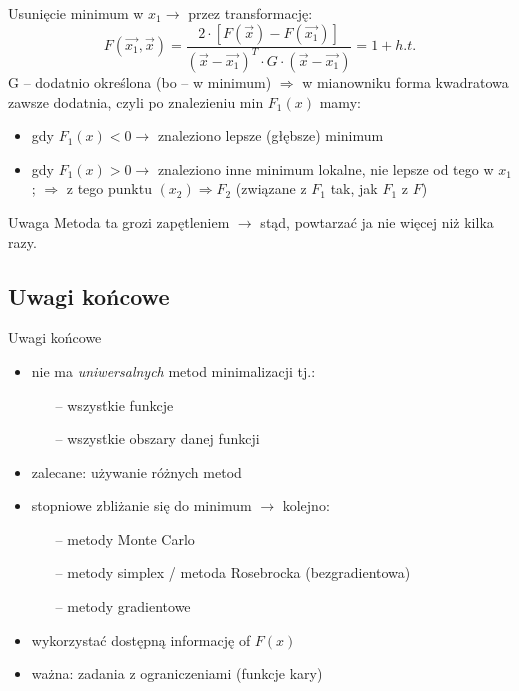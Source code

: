   \begin{frame}
    Usunięcie minimum w $x_{1} \to$ przez transformację:
    \begin{displaymath}
      F(\vec{x_{1}}{,}\vec{x}) =
      \frac{2 \cdot \left[ F(\vec{x}) - F(\vec{x_{1}}) \right]}
      {(\vec{x} - \vec{x_{1}})^T \cdot G \cdot (\vec{x} - \vec{x_{1}})} =
      1 + h.t.
    \end{displaymath}
    G -- dodatnio określona (bo -- w minimum) $\Rightarrow$
    w mianowniku forma kwadratowa zawsze dodatnia, czyli
    po znalezieniu min $F_{1}(x)$ mamy:
    \begin{itemize}
      \item gdy $F_{1}(x) < 0 \to$ znaleziono lepsze
      (głębsze) minimum
      \item gdy $F_{1}(x) > 0 \to$ znaleziono inne minimum
      lokalne, nie lepsze od tego w $x_{1}$; $\Rightarrow$
      z tego punktu $(x_{2}) \Rightarrow F_{2}$ (związane z
      $F_{1}$ tak, jak $F_{1}$ z $F$)
    \end{itemize}
    \begin{alertblock}{Uwaga}
      Metoda ta grozi zapętleniem $\to$ stąd, powtarzać
      ja nie więcej niż kilka razy.
    \end{alertblock}
  \end{frame}

  \subsection{Uwagi końcowe}
  \begin{frame}{Uwagi końcowe}
    \begin{itemize}
      \item nie ma \emph{uniwersalnych} metod
      minimalizacji tj.:
      \begin{itemize}
        \item[--] wszystkie funkcje
        \item[--] wszystkie obszary danej funkcji
      \end{itemize}
      \item zalecane: używanie różnych metod
      \item stopniowe zbliżanie się do minimum $\to$
      kolejno:
      \begin{itemize}
        \item[--] metody Monte Carlo
        \item[--] metody simplex / metoda Rosebrocka
        (bezgradientowa)
        \item[--] metody gradientowe
      \end{itemize}
      \item wykorzystać dostępną informację of $F(x)$
      \item ważna: zadania z ograniczeniami (funkcje kary)
    \end{itemize}
  \end{frame}

